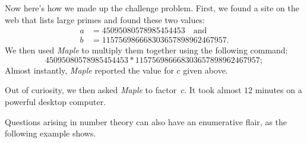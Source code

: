 \begin{example}
Now here's how we made up the challenge problem.  First, we found a
site on the web that lists large primes and found these two values:
\begin{align*}
a &=  45095080578985454453\quad\text{and}\\ 
b &=  115756986668303657898962467957.
\end{align*}
We then used \emph{Maple} to multiply them together using the following command:
\[
45095080578985454453*115756986668303657898962467957;
\]
Almost instantly, \emph{Maple} reported the value for $c$ given above.

Out of curiosity, we then asked \emph{Maple} to factor~$c$.  It took almost
$12$ minutes on a powerful desktop computer.
\end{example}

Questions arising in number theory can also have an enumerative flair,
as the following example shows.

